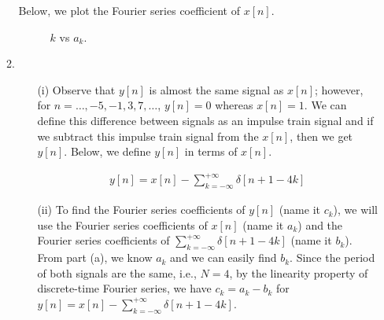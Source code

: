 \documentclass[10pt,a4paper, margin=1in]{article}
\begin{document}
\begin{enumerate}
\begin{enumerate}
    Below, we plot the Fourier series coefficient of $x[n]$.
    
    

    
    \begin{figure} [H]
    \centering
    \caption{$k$ vs $a_k$.}
    \label{fig:q1}
\end{figure}
    
    \item
    	\begin{itemize}
		
    
    \item[(i)]
    Observe that $y[n]$ is almost the same signal as $x[n]$; however, for $n = \ldots, -5, -1, 3, 7, \ldots$, $y[n] = 0$ whereas $x[n] = 1$. We can define this difference between signals as an impulse train signal and if we subtract this impulse train signal from the $x[n]$, then we get $y[n]$. Below, we define $y[n]$ in terms of $x[n]$.
    
    \begin{equation}
    \begin{split}
    	y[n] = x[n] - \sum_{k = - \infty}^{+ \infty} \delta[n + 1 - 4k]
    \end{split}
    \end{equation}
    
    
    \item[(ii)]
    To find the Fourier series coefficients of $y[n]$ (name it $c_k$), we will use the Fourier series coefficients of $x[n]$ (name it $a_k$) and the Fourier series coefficients of $\sum_{k = - \infty}^{+ \infty} \delta[n + 1 - 4k]$ (name it $b_k$). From part (a), we know $a_k$ and we can easily find $b_k$. Since the period of both signals are the same, i.e., $N = 4$,  by the linearity property of discrete-time Fourier series, we have $c_k = a_k - b_ k$ for $y[n] = x[n] - \sum_{k = - \infty}^{+ \infty} \delta[n + 1 - 4k]$.
    

\end{itemize}
\end{enumerate}
\end{enumerate}
\end{document}
